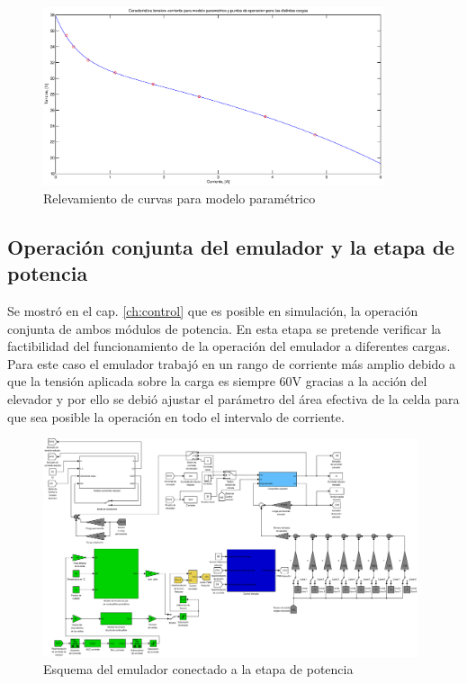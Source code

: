 \begin{figure}[H]
  \centering
  \includegraphics[width=10cm]{gfx/I-V_modelo_2.eps}
  \caption{Relevamiento de curvas para modelo paramétrico}
\end{figure}

\subsection{Operación conjunta del emulador y la etapa de potencia}
Se mostró en el cap. \ref{ch:control} que es posible en simulación, la operación conjunta de ambos módulos de potencia. En esta etapa se pretende verificar
la factibilidad del funcionamiento de la operación del emulador a diferentes cargas. Para este caso el emulador trabajó en un rango de corriente más amplio
debido a que la tensión aplicada sobre la carga es siempre 60V gracias a la acción del elevador y por ello se debió ajustar el parámetro del área efectiva
de la celda para que sea posible la operación en todo el intervalo de corriente.

\begin{figure}[H]
 \centering
 \includegraphics[width=11cm]{gfx/modelo_emulador_acoplado.eps}
 \caption{Esquema del emulador conectado a la etapa de potencia}
 \label{fig:modelo_emulador_acoplado}
\end{figure}

